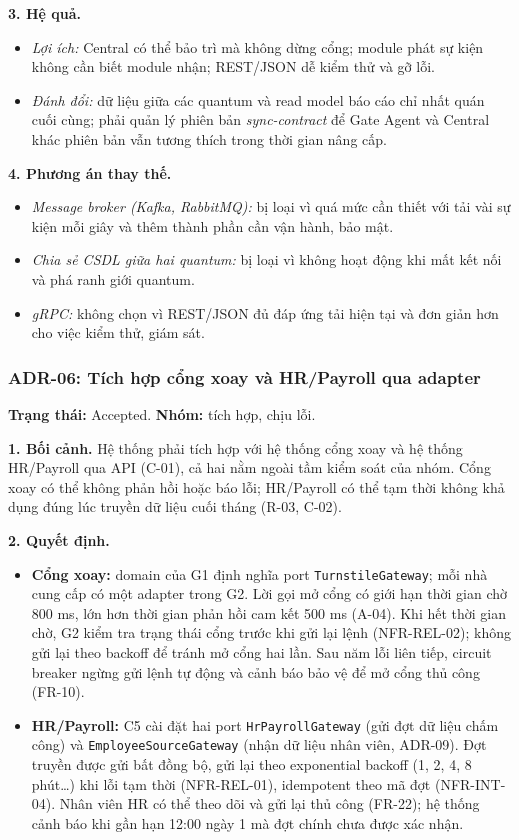 \noindent\textbf{3. Hệ quả.}
\begin{itemize}
    \item \textit{Lợi ích:} Central có thể bảo trì mà không dừng cổng; module phát sự kiện không cần biết module nhận; REST/JSON dễ kiểm thử và gỡ lỗi.
    \item \textit{Đánh đổi:} dữ liệu giữa các quantum và read model báo cáo chỉ nhất quán cuối cùng; phải quản lý phiên bản \textit{sync-contract} để Gate Agent và Central khác phiên bản vẫn tương thích trong thời gian nâng cấp.
\end{itemize}

\noindent\textbf{4. Phương án thay thế.}
\begin{itemize}
    \item \textit{Message broker (Kafka, RabbitMQ):} bị loại vì quá mức cần thiết với tải vài sự kiện mỗi giây và thêm thành phần cần vận hành, bảo mật.
    \item \textit{Chia sẻ CSDL giữa hai quantum:} bị loại vì không hoạt động khi mất kết nối và phá ranh giới quantum.
    \item \textit{gRPC:} không chọn vì REST/JSON đủ đáp ứng tải hiện tại và đơn giản hơn cho việc kiểm thử, giám sát.
\end{itemize}

\subsubsection{ADR-06: Tích hợp cổng xoay và HR/Payroll qua adapter}\label{adr:06}
\textbf{Trạng thái:} Accepted. \textbf{Nhóm:} tích hợp, chịu lỗi.

\noindent\textbf{1. Bối cảnh.} Hệ thống phải tích hợp với hệ thống cổng xoay và hệ thống HR/Payroll qua API (C-01), cả hai nằm ngoài tầm kiểm soát của nhóm. Cổng xoay có thể không phản hồi hoặc báo lỗi; HR/Payroll có thể tạm thời không khả dụng đúng lúc truyền dữ liệu cuối tháng (R-03, C-02).

\noindent\textbf{2. Quyết định.}
\begin{itemize}
    \item \textbf{Cổng xoay:} domain của G1 định nghĩa port \texttt{TurnstileGateway}; mỗi nhà cung cấp có một adapter trong G2. Lời gọi mở cổng có giới hạn thời gian chờ 800 ms, lớn hơn thời gian phản hồi cam kết 500 ms (A-04). Khi hết thời gian chờ, G2 kiểm tra trạng thái cổng trước khi gửi lại lệnh (NFR-REL-02); không gửi lại theo backoff để tránh mở cổng hai lần. Sau năm lỗi liên tiếp, circuit breaker ngừng gửi lệnh tự động và cảnh báo bảo vệ để mở cổng thủ công (FR-10).
    \item \textbf{HR/Payroll:} C5 cài đặt hai port \texttt{HrPayroll\-Gateway} (gửi đợt dữ liệu chấm công) và \texttt{Employee\-Source\-Gateway} (nhận dữ liệu nhân viên, ADR-09). Đợt truyền được gửi bất đồng bộ, gửi lại theo exponential backoff (1, 2, 4, 8 phút\ldots) khi lỗi tạm thời (NFR-REL-01), idempotent theo mã đợt (NFR-INT-04). Nhân viên HR có thể theo dõi và gửi lại thủ công (FR-22); hệ thống cảnh báo khi gần hạn 12:00 ngày 1 mà đợt chính chưa được xác nhận.
\end{itemize}

